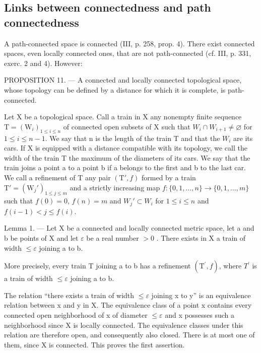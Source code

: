 \subsection{Links between connectedness and path connectedness}

A path-connected space is connected (III, p. 258, prop. 4). There exist connected spaces, even locally connected ones, that are not path-connected (cf. III, p. 331, exerc. 2 and 4). However:

PROPOSITION 11. --- A connected and locally connected topological space, whose topology can be defined by a distance for which it is complete, is path-connected.

Let X be a topological space. Call a train in X any nonempty finite sequence \(\mathrm{T} = (\mathrm{W}_{i})_{1 \leqslant i \leqslant n}\) of connected open subsets of X such that \(W_{i} \cap W_{i+1} \neq \varnothing\) for \(1 \leqslant i \leqslant n-1\). We say that n is the length of the train T and that the \(W_{i}\) are its cars. If X is equipped with a distance compatible with its topology, we call the width of the train T the maximum of the diameters of its cars. We say that the train joins a point a to a point b if a belongs to the first and b to the last car. We call a refinement of T any pair \((\mathrm{T}', f)\) formed by a train \(\mathrm{T}' = (\mathrm{W}_{j}')_{1 \leqslant j \leqslant m}\) and a strictly increasing map \(f: \{0, 1, \ldots, n\} \to \{0, 1, \ldots, m\}\) such that \(f(0) = 0\), \(f(n) = m\) and \(W_{j}' \subset W_{i}\) for \(1 \leqslant i \leqslant n\) and \(f(i-1) < j \leqslant f(i)\).

Lemma 1. --- Let X be a connected and locally connected metric space, let a and b be points of X and let \(\varepsilon\) be a real number \(>0\) . There exists in X a train of width \(\leqslant \varepsilon\) joining a to b.

More precisely, every train T joining a to b has a refinement \((\mathrm{T}^{\prime}, f)\), where \(T^{\prime}\) is a train of width \(\leqslant\varepsilon\) joining a to b.

The relation “there exists a train of width \(\leqslant\varepsilon\) joining x to y” is an equivalence relation between x and y in X. The equivalence class of a point x contains every connected open neighborhood of x of diameter \(\leqslant\varepsilon\) and x possesses such a neighborhood since X is locally connected. The equivalence classes under this relation are therefore open, and consequently also closed. There is at most one of them, since X is connected. This proves the first assertion.

